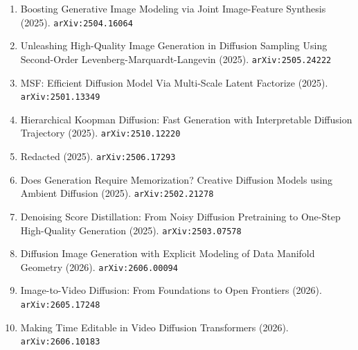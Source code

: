 \documentclass[11pt]{article}
\begin{document}
\begin{enumerate}
  \item Boosting Generative Image Modeling via Joint Image-Feature Synthesis (2025). \texttt{arXiv:2504.16064}
  \item Unleashing High-Quality Image Generation in Diffusion Sampling Using Second-Order Levenberg-Marquardt-Langevin (2025). \texttt{arXiv:2505.24222}
  \item MSF: Efficient Diffusion Model Via Multi-Scale Latent Factorize (2025). \texttt{arXiv:2501.13349}
  \item Hierarchical Koopman Diffusion: Fast Generation with Interpretable Diffusion Trajectory (2025). \texttt{arXiv:2510.12220}
  \item Redacted (2025). \texttt{arXiv:2506.17293}
  \item Does Generation Require Memorization? Creative Diffusion Models using Ambient Diffusion (2025). \texttt{arXiv:2502.21278}
  \item Denoising Score Distillation: From Noisy Diffusion Pretraining to One-Step High-Quality Generation (2025). \texttt{arXiv:2503.07578}
  \item Diffusion Image Generation with Explicit Modeling of Data Manifold Geometry (2026). \texttt{arXiv:2606.00094}
  \item Image-to-Video Diffusion: From Foundations to Open Frontiers (2026). \texttt{arXiv:2605.17248}
  \item Making Time Editable in Video Diffusion Transformers (2026). \texttt{arXiv:2606.10183}
\end{enumerate}
\end{document}
